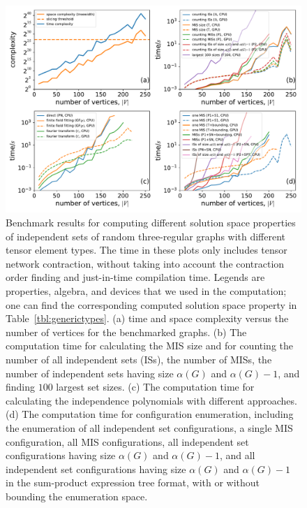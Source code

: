 \documentclass[onefignum, onetabnum]{siamart190516}
\newcommand{\<}{\langle}
\renewcommand{\>}{\rangle}
\newcommand{\Tbl}[1]{Table~\ref{#1}}
\begin{document}
\begin{figure} 
    \centering
    \includegraphics[width=\textwidth, trim={0cm 0cm 0cm 0cm}, clip]{figures/fig1.pdf}
    \caption{Benchmark results for computing different solution space properties of independent sets of random three-regular graphs with different tensor element types.
    The time in these plots only includes tensor network contraction, without taking into account the contraction order finding and just-in-time compilation time.
    Legends are properties, algebra, and devices that we used in the computation; one can find the corresponding computed solution space property in \Tbl{tbl:generictypes}.
    (a) time and space complexity versus the number of vertices for the benchmarked graphs.
    (b) The computation time for calculating the MIS size and for counting the number of all independent sets (ISs), the number of MISs,
        the number of independent sets having size $\alpha(G)$ and $\alpha(G)-1$, and finding $100$ largest set sizes.
    (c) The computation time for calculating the independence polynomials with different approaches.
    (d) The computation time for configuration enumeration, including the enumeration of all independent set configurations, a single MIS configuration, all MIS configurations,
    all independent set configurations having size $\alpha(G)$ and $\alpha(G)-1$, and all independent set configurations having size $\alpha(G)$ and $\alpha(G)-1$ in the sum-product expression tree format,
    with or without bounding the enumeration space.
    }
    \label{fig:benchmark}
\end{figure}
\end{document}
